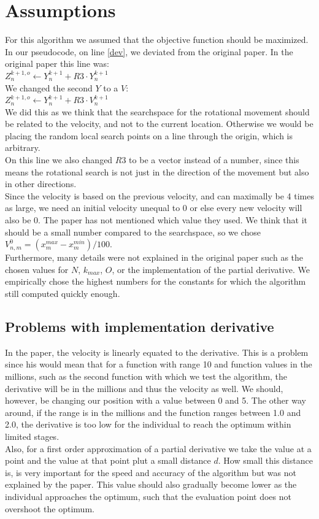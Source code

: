 \documentclass[runningheads]{llncs}
\begin{document}
\newpage
\section{Assumptions}
For this algorithm we assumed that the objective function should be maximized.\\
In our pseudocode, on line \ref{dev}, we deviated from the original paper. In the original paper this line was: \\
$Z_n^{k+1, o} \leftarrow Y_n^{k+1} + R3 \cdot Y_n^{k+1}$ \\\label{assumption}
We changed the second $ Y $ to a $V$:\\
$Z_n^{k+1, o} \leftarrow Y_n^{k+1} + R3 \cdot V_n^{k+1}$ \\
We did this as we think that the searchspace for the rotational movement should be related to the velocity, and not to the current location. Otherwise we would be placing the random local search points on a line through the origin, which is arbitrary. \\
On this line we also changed $R3$ to be a vector instead of a number, since this means the rotational search is not just in the direction of the movement but also in other directions. \\
Since the velocity is based on the previous velocity, and can maximally be 4 times as large, we need an initial velocity unequal to 0 or else every new velocity will also be 0. The paper has not mentioned which value they used. We think that it should be a small number compared to the searchspace, so we chose $V_{n,m}^0 = (x_m^{max} - x_m^{min})/100$.\\
Furthermore, many details were not explained in the original paper such as the chosen values for $N$, $k_{max}$, $O$, or the implementation of the partial derivative. We empirically chose the highest numbers for the constants for which the algorithm still computed quickly enough.\\

\subsection{Problems with implementation derivative}
In the paper, the velocity is linearly equated to the derivative. This is a problem since his would mean that for a function with range 10 and function values in the millions, such as the second function with which we test the algorithm, the derivative will be in the millions and thus the velocity as well. We should, however, be changing our position with a value between 0 and 5. The other way around, if the range is in the millions and the function ranges between 1.0 and 2.0, the derivative is too low for the individual to reach the optimum within limited stages.\\
Also, for a first order approximation of a partial derivative we take the value at a point and the value at that point plut a small distance $d$. How small this distance is, is very important for the speed and accuracy of the algorithm but was not explained by the paper. This value should also gradually become lower as the individual approaches the optimum, such that the evaluation point does not overshoot the optimum.\\
\end{document}
